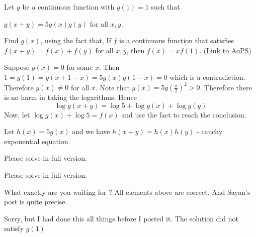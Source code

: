 \begin{problem}
	Let $g$ be a continuous function with $g(1)=1$ such that

$g(x+y)=5g(x)g(y)$ for all $x,y$.

Find $g(x)$, using the fact that, If $f$ is a continuous function that satisfies $f(x + y) =f(x) + f(y)$ for all $x, y$, then $f(x) = xf(1)$.
	\flushright \href{https://artofproblemsolving.com/community/c6h574392}{(Link to AoPS)}
\end{problem}



\begin{solution}
	Suppose $g(x)=0$ for some $x$. Then $1=g(1)=g(x+1-x)=5g(x)g(1-x)=0$ which is a contradiction. Therefore $g(x) \neq 0$ for all $x$. Note that $g(x)=5g\left(\frac{x}2\right)^2 > 0$. Therefore there is no harm in taking the logarithms. Hence
\[\log g(x+y) =\log 5+\log g(x)+ \log g(y)\]
Now, let $\log g(x)+\log 5 = f(x)$ and use the fact to reach the conclusion.
\end{solution}



\begin{solution}
	Let $h(x)=5g(x)$ and we have $h(x+y)=h(x)h(y)$ - cauchy exponential equation.
\end{solution}



\begin{solution}
	Please solve in full version.
\end{solution}



\begin{solution}
	\begin{tcolorbox}Please solve in full version.\end{tcolorbox}
What exactly are you waiting for ?
All elements above are correct. And Sayan's post is quite precise.
\end{solution}



\begin{solution}
	Sorry, but I had done this all things before I posted it. The solution did not satisfy $g(1)$
\end{solution}



